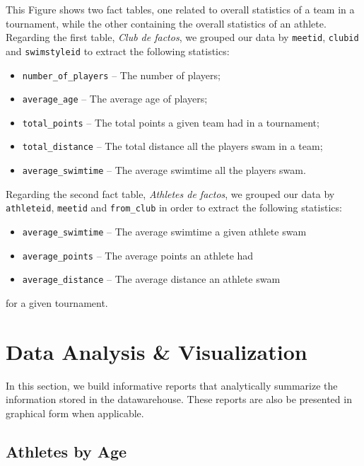 \documentclass[a4paper, 11pt]{article}
\begin{document}
This Figure shows two fact tables, one related to overall statistics of a team in a tournament, while the other containing the overall statistics of an athlete. Regarding the first table, \textit{Club de factos}, we grouped our data by \texttt{meetid}, \texttt{clubid} and \texttt{swimstyleid} to extract the following statistics:

\begin{itemize}
    \item \texttt{number\_of\_players} -- The number of players;
    \item \texttt{average\_age} -- The average age of players;
    \item \texttt{total\_points} -- The total points a given team had in a tournament;
    \item \texttt{total\_distance} -- The total distance all the players swam in a team;
    \item \texttt{average\_swimtime} -- The average swimtime all the players swam.
\end{itemize}

Regarding the second fact table, \textit{Athletes de factos}, we grouped our data by \texttt{athleteid}, \texttt{meetid} and \texttt{from\_club} in order to extract the following statistics:

\begin{itemize}
    \item \texttt{average\_swimtime} -- The average swimtime a given athlete swam
    \item \texttt{average\_points} -- The average points an athlete had
    \item \texttt{average\_distance} -- The average distance an athlete swam
\end{itemize}

for a given tournament.

\pagebreak

\section{Data Analysis \& Visualization} \label{sec:analysis}

In this section, we build informative reports that analytically summarize the information stored in the datawarehouse. These reports are also be presented in graphical form when applicable.

\subsection{Athletes by Age}
\end{document}
